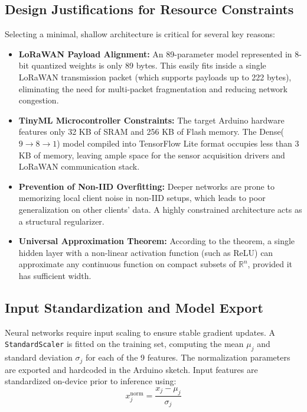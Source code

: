 \subsection{Design Justifications for Resource Constraints}
Selecting a minimal, shallow architecture is critical for several key reasons:
\begin{itemize}
    \item \textbf{LoRaWAN Payload Alignment:} An 89-parameter model represented in 8-bit quantized weights is only 89 bytes. This easily fits inside a single LoRaWAN transmission packet (which supports payloads up to 222 bytes), eliminating the need for multi-packet fragmentation and reducing network congestion.
    \item \textbf{TinyML Microcontroller Constraints:} The target Arduino hardware features only 32 KB of SRAM and 256 KB of Flash memory. The Dense($9{\to}8{\to}1$) model compiled into TensorFlow Lite format occupies less than 3 KB of memory, leaving ample space for the sensor acquisition drivers and LoRaWAN communication stack.
    \item \textbf{Prevention of Non-IID Overfitting:} Deeper networks are prone to memorizing local client noise in non-IID setups, which leads to poor generalization on other clients' data. A highly constrained architecture acts as a structural regularizer.
    \item \textbf{Universal Approximation Theorem:} According to the theorem, a single hidden layer with a non-linear activation function (such as ReLU) can approximate any continuous function on compact subsets of $\mathbb{R}^n$, provided it has sufficient width.
\end{itemize}

\subsection{Input Standardization and Model Export}
Neural networks require input scaling to ensure stable gradient updates. A \texttt{StandardScaler} is fitted on the training set, computing the mean $\mu_j$ and standard deviation $\sigma_j$ for each of the 9 features. The normalization parameters are exported and hardcoded in the Arduino sketch. Input features are standardized on-device prior to inference using:
\begin{equation}
    x^{\text{norm}}_j = \frac{x_j - \mu_j}{\sigma_j}
\end{equation}


